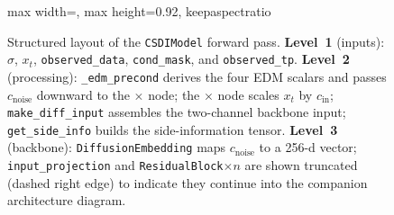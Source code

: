 \begin{figure}[h]
\begin{adjustbox}{max width=\textwidth, max height=0.92\textheight, keepaspectratio}
\begin{tikzpicture}
\end{tikzpicture}
\end{adjustbox}
    \caption{%
    Structured layout of the \texttt{CSDIModel} forward pass.
    \textbf{Level~1} (inputs): $\sigma$, $x_t$, \texttt{observed\_data},
    \texttt{cond\_mask}, and \texttt{observed\_tp}.
    \textbf{Level~2} (processing): \texttt{\_edm\_precond} derives the four
    EDM scalars and passes $c_{\mathrm{noise}}$ downward to the $\times$ node;
    the $\times$ node scales $x_t$ by $c_{\mathrm{in}}$;
    \texttt{make\_diff\_input} assembles the two-channel backbone input;
    \texttt{get\_side\_info} builds the side-information tensor.
    \textbf{Level~3} (backbone): \texttt{DiffusionEmbedding} maps
    $c_{\mathrm{noise}}$ to a 256-d vector; \texttt{input\_projection}
    and \texttt{ResidualBlock}$\times n$ are shown truncated (dashed right
    edge) to indicate they continue into the companion architecture diagram.%
    }
    \label{fig:csdi_overview_v5}
\end{figure}